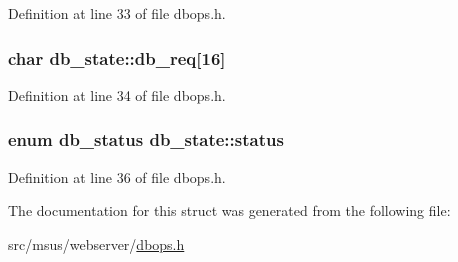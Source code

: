 Definition at line 33 of file dbops.\-h.

\hypertarget{structdb__state_aaacfe4e1d9c23b3eeed0f6a96da1874d}{
\subsubsection[{db\-\_\-req}]{\setlength{\rightskip}{0pt plus 5cm}char db\-\_\-state\-::db\-\_\-req\mbox{[}16\mbox{]}}}\label{structdb__state_aaacfe4e1d9c23b3eeed0f6a96da1874d}


Definition at line 34 of file dbops.\-h.

\hypertarget{structdb__state_a55975b94a2a298c08156b77d1dae8973}{
\subsubsection[{status}]{\setlength{\rightskip}{0pt plus 5cm}enum {\bf db\-\_\-status} db\-\_\-state\-::status}}\label{structdb__state_a55975b94a2a298c08156b77d1dae8973}


Definition at line 36 of file dbops.\-h.



The documentation for this struct was generated from the following file\-:\begin{DoxyCompactItemize}
\item 
src/msus/webserver/\hyperlink{dbops_8h}{dbops.\-h}\end{DoxyCompactItemize}
